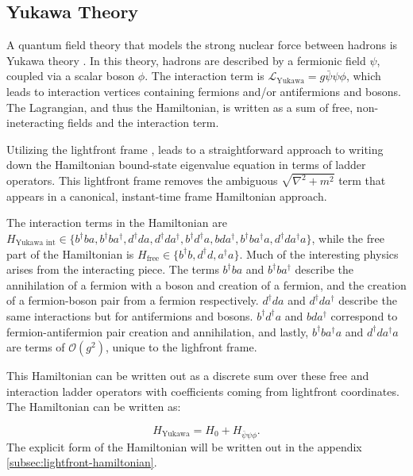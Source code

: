 \subsection{Yukawa Theory}
A quantum field theory that models the strong nuclear force between hadrons is Yukawa theory \cite{Peskin:1995ev}. In this theory, hadrons are described by a fermionic field $\psi$, coupled via a scalar boson $\phi$. The interaction term is $\mathcal{L}_{\text{Yukawa}} = g\bar\psi \psi \phi$, which leads to interaction vertices containing fermions and/or antifermions and bosons. The Lagrangian, and thus the Hamiltonian, is written as a sum of free, non-ineteracting fields and the interaction term.

Utilizing the lightfront frame \cite{Dirac1949}, leads to a straightforward approach to writing down the Hamiltonian bound-state eigenvalue equation in terms of ladder operators. This lightfront frame removes the ambiguous $\sqrt{\nabla^2 + m^2}$ term that appears in a canonical, instant-time frame Hamiltonian approach. 

The interaction terms in the Hamiltonian are $H_{\text{Yukawa int}} \in \{b^\dagger b a, b^\dagger b a^\dagger, d^\dagger d a, d^\dagger d a^\dagger, b^\dagger d^\dagger a, bda^\dagger, b^\dagger b a^\dagger a, d^\dagger d a^\dagger a \}$, while the free part of the Hamiltonian is $H_{\text{free}} \in \{b^\dagger b, d^\dagger d, a^\dagger a \}$. 
Much of the interesting physics arises from the interacting piece. The terms $b^\dagger b a$ and $b^\dagger b a^\dagger$ describe the annihilation of a fermion with a boson and creation of a fermion, and the creation of a fermion-boson pair from a fermion respectively. $d^\dagger d a$ and $d^\dagger d a^\dagger$ describe the same interactions but for antifermions and bosons. 
$b^\dagger d^\dagger a$ and $bda^\dagger$ correspond to fermion-antifermion pair creation and annihilation, and lastly, $b^\dagger b a^\dagger a$ and $d^\dagger d a^\dagger a$ are terms of $\mathcal{O}(g^2)$, unique to the lighfront frame.

This Hamiltonian can be written out as a discrete sum over these free and interaction ladder operators with coefficients coming from lightfront coordinates. The Hamiltonian can be written as:

\begin{equation}
    \label{eq:Yukawa-hamiltonian}
    H_{\text{Yukawa}} = H_0 + H_{\bar\psi \psi \phi}.
\end{equation}
The explicit form of the Hamiltonian will be written out in the appendix \ref{subsec:lightfront-hamiltonian}.

